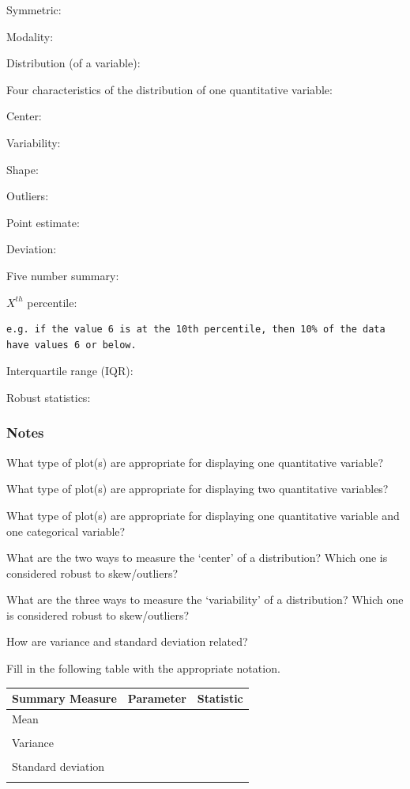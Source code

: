 \documentclass[
]{report}
\newcommand{\rgs}{\vspace{12pt}} %
\newcommand{\rgi}{\hspace{24pt}}  %
\begin{document}
Symmetric:
\rgs

Modality:
\rgs

Distribution (of a variable):
\rgs

\rgi Four characteristics of the distribution of one quantitative variable:

\rgi Center:
\rgs

\rgi Variability:
\rgs

\rgi Shape:
\rgs

\rgi Outliers:
\rgs

Point estimate:
\rgs

Deviation:
\rgs

Five number summary:
\rgs

\(X^{th}\) percentile:
\rgs

\begin{verbatim}
e.g. if the value 6 is at the 10th percentile, then 10% of the data have values 6 or below.
\end{verbatim}

Interquartile range (IQR):
\rgs

Robust statistics:
\rgs

\hypertarget{notes-6}{%
\subsubsection*{Notes}\label{notes-6}}

What type of plot(s) are appropriate for displaying one quantitative variable?
\rgs

What type of plot(s) are appropriate for displaying two quantitative variables?
\rgs

What type of plot(s) are appropriate for displaying one quantitative variable and one categorical variable?
\rgs

What are the two ways to measure the `center' of a distribution? Which one is considered robust to skew/outliers?
\rgs

What are the three ways to measure the `variability' of a distribution? Which one is considered robust to skew/outliers?
\rgs

How are variance and standard deviation related?
\rgs

Fill in the following table with the appropriate notation.

\begin{center}
\begin{tabular}{|l|p{2in}|p{2in}|} \hline
Summary Measure & Parameter & Statistic \\ \hline
Mean & & \\ 
& & \\ \hline
Variance & & \\ 
& & \\ \hline
Standard deviation & & \\ 
& & \\ \hline
\end{tabular}
\end{center}
\end{document}
